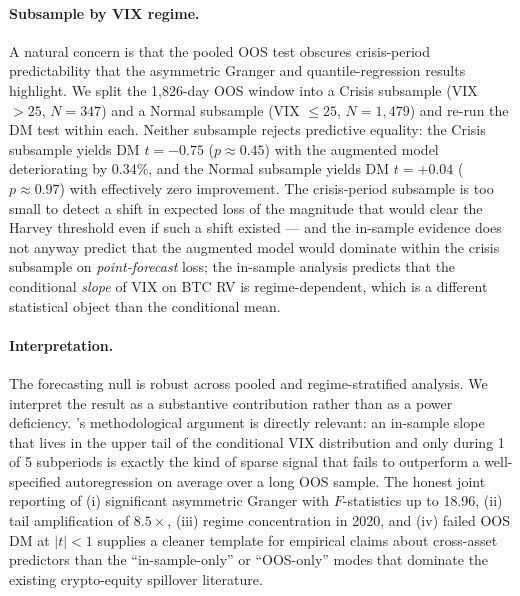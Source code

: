 \documentclass[11pt,a4paper]{article}
\begin{document}
\paragraph{Subsample by VIX regime.} A natural concern is that the pooled OOS test obscures crisis-period predictability that the asymmetric Granger and quantile-regression results highlight. We split the 1{,}826-day OOS window into a Crisis subsample (VIX $> 25$, $N = 347$) and a Normal subsample (VIX $\le 25$, $N = 1{,}479$) and re-run the DM test within each. Neither subsample rejects predictive equality: the Crisis subsample yields DM $t = -0.75$ ($p \approx 0.45$) with the augmented model deteriorating by 0.34\%, and the Normal subsample yields DM $t = +0.04$ ($p \approx 0.97$) with effectively zero improvement.%
 The crisis-period subsample is too small to detect a shift in expected loss of the magnitude that would clear the Harvey threshold even if such a shift existed --- and the in-sample evidence does not anyway predict that the augmented model would dominate within the crisis subsample on \emph{point-forecast} loss; the in-sample analysis predicts that the conditional \emph{slope} of VIX on BTC RV is regime-dependent, which is a different statistical object than the conditional mean.

\paragraph{Interpretation.} The forecasting null is robust across pooled and regime-stratified analysis. We interpret the result as a substantive contribution rather than as a power deficiency. \citet{conrad2020}'s methodological argument is directly relevant: an in-sample slope that lives in the upper tail of the conditional VIX distribution and only during 1 of 5 subperiods is exactly the kind of sparse signal that fails to outperform a well-specified autoregression on average over a long OOS sample. The honest joint reporting of (i) significant asymmetric Granger with $F$-statistics up to 18.96, (ii) tail amplification of $8.5\times$, (iii) regime concentration in 2020, and (iv) failed OOS DM at $|t| < 1$ supplies a cleaner template for empirical claims about cross-asset predictors than the ``in-sample-only'' or ``OOS-only'' modes that dominate the existing crypto-equity spillover literature.
\end{document}
